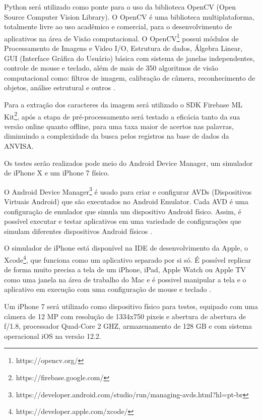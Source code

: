 Python será utilizado como ponte para o uso da biblioteca OpenCV (Open Source Computer Vision Library). O OpenCV é uma biblioteca multiplataforma, totalmente livre ao uso acadêmico e comercial, para o desenvolvimento de aplicativos na área de Visão computacional. O OpenCV\footnote{https://opencv.org/}
possui módulos de Processamento de Imagens e Video I/O, Estrutura de dados, Álgebra Linear, GUI (Interface Gráfica do Usuário) básica com sistema de janelas independentes, controle de mouse e teclado, além de mais de 350 algoritmos de visão computacional como: filtros de imagem, calibração de câmera, reconhecimento de objetos, análise estrutural e outros \cite{RVOPENCV}. 

Para a extração dos caracteres da imagem será utilizado o SDK Firebase ML Kit\footnote{https://firebase.google.com/}, após a etapa de pré-processamento será testado a eficácia tanto da sua versão online quanto offline, para uma taxa maior de acertos nas palavras, diminuindo a complexidade da busca pelos registros na base de dados da ANVISA.

Os testes serão realizados pode meio do Android Device Manager, um simulador de iPhone X e um iPhone 7 físico. 

O Android Device Manager\footnote{https://developer.android.com/studio/run/managing-avds.html?hl=pt-br} é usado para criar e configurar AVDs (Dispositivos Virtuais Android) que são executados no Android Emulator. Cada AVD é uma configuração de emulador que simula um dispositivo Android físico. Assim, é possível executar e testar aplicativos em uma variedade de configurações que simulam diferentes dispositivos Android físicos  \cite{ADVDUNN}.

O simulador de iPhone está disponível na IDE de desenvolvimento da Apple, o Xcode\footnote{https://developer.apple.com/xcode/}, que funciona como um aplicativo separado por si só. É possível replicar de forma muito precisa a tela de um iPhone, iPad, Apple Watch ou Apple TV como uma janela na área de trabalho do Mac e é possivel manipular a tela e o aplicativo em execução com uma configuração de mouse e teclado \cite{IPHONESIMULATOR}.

Um iPhone 7 será utilizado como dispositivo físico  para testes, equipado com uma câmera de 12 MP com resolução de 1334x750 pixeis e abertura de abertura de ƒ/1.8, processador Quad-Core 2 GHZ, armazenamento de 128 GB e com sistema operacional iOS na versão 12.2.


